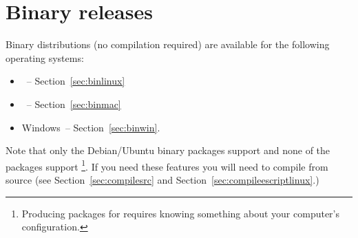 %
%
%


\chapter{Binary releases}\label{chap:bin}

Binary distributions (no compilation required) are available for the following operating systems:
\begin{itemize}
 \item \linux~-- Section~\ref{sec:binlinux}
 \item \macosx~-- Section~\ref{sec:binmac}
 \item Windows~-- Section~\ref{sec:binwin}.
\end{itemize}

Note that only the Debian/Ubuntu binary packages support \openmp and none of the packages support 
\mpi\footnote{Producing packages for \mpi requires knowing something about your computer's configuration.}.
If you need these features you will need to compile \esfinley from source (see Section~\ref{sec:compilesrc} 
and Section~\ref{sec:compileescriptlinux}.)



